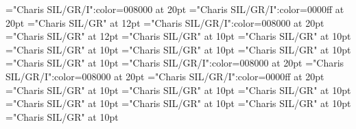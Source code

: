 \documentclass[a4paper]{article}
\begin{document}
\pagestyle{plain}
\sloppy
\setlength{\parfillskip}{0pt plus 1fil}
\font\pronunciationenUSpronunciationarticlebefore="Charis SIL/GR/I":color=008000 at 20pt
\font\pronunciationenUKpronunciationenUSbefore="Charis SIL/GR/I":color=0000ff at 20pt
\font\pronunciationenUSfirstoftypebefore="Charis SIL/GR" at 12pt
\font\pronunciationenUSpronunciationbefore="Charis SIL/GR/I":color=008000 at 20pt
\font\pronunciationenUSbefore="Charis SIL/GR" at 12pt
\font\sectionletterdictionary="Charis SIL/GR" at 10pt
\font\headsectionletterdictionary="Charis SIL/GR" at 10pt
\font\articledictionary="Charis SIL/GR" at 10pt
\font\firstoftypeheadwordlastoftypearticledictionary="Charis SIL/GR" at 10pt
\font\firstoftypegrammarrequireslastoftypearticledictionary="Charis SIL/GR" at 10pt
\font\firstoftypelastoftyperelationsynonymarticledictionary="Charis SIL/GR" at 10pt
\font\firstoftypepronunciationenUKarticledictionary="Charis SIL/GR/I":color=008000 at 20pt
\font\firstoftypepronunciationenUSarticledictionary="Charis SIL/GR/I":color=008000 at 20pt
\font\lastoftypepronunciationenUKarticledictionary="Charis SIL/GR/I":color=0000ff at 20pt
\font\firstoftypegrammarcategorylastoftypearticledictionary="Charis SIL/GR" at 10pt
\font{}="Charis SIL/GR" at 10pt
\font\firstoftypelastoftypenotearticledictionary="Charis SIL/GR" at 10pt
\font\exampleusefirstoftypearticledictionary="Charis SIL/GR" at 10pt
\font\examplefirstoftypearticledictionary="Charis SIL/GR" at 10pt
\font\exampleuselastoftypearticledictionary="Charis SIL/GR" at 10pt
\font\examplelastoftypearticledictionary="Charis SIL/GR" at 10pt

\mbox{} 
\newpage 
\newpage 
\setcounter{page}{1} 
\pagestyle{fancy} 


\end{document}
